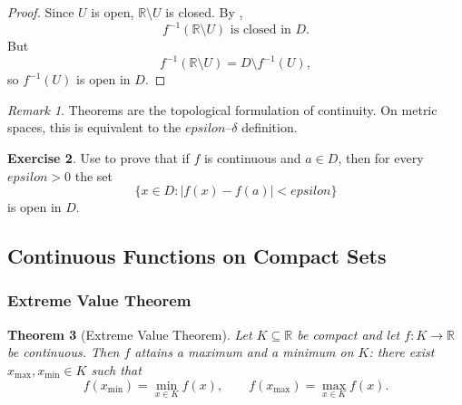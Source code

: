 \documentclass[12pt]{article}
\numberwithin{equation}{section}
\def\abs#1{|#1|}
\def\eps{epsilon}
\newcommand{\RR}{\mathbb{R}}
\DeclarePairedDelimiter{\abs}{\lvert}{\rvert}
\newcommand{\eps}{\varepsilon}               %
\theoremstyle{plain}
\newtheorem{theorem}{Theorem}[section]
\theoremstyle{definition}
\newtheorem{exercise}[theorem]{Exercise}
\theoremstyle{remark}
\newtheorem{remark}[theorem]{Remark}
\begin{document}
\begin{proof}
Since $U$ is open, $\RR\setminus U$ is closed. By ,
\[
f^{-1}(\RR\setminus U) \text{ is closed in } D.
\]
But
\[
f^{-1}(\RR\setminus U)=D\setminus f^{-1}(U),
\]
so $f^{-1}(U)$ is open in $D$.
\end{proof}

\begin{remark}
Theorems  are the topological formulation of continuity.
On metric spaces, this is equivalent to the $\eps$--$\delta$ definition.
\end{remark}

\begin{exercise}
Use  to prove that if $f$ is continuous and $a\in D$, then for every $\eps>0$ the set
\[
\{x\in D:\abs{f(x)-f(a)}<\eps\}
\]
is open in $D$.
\end{exercise}

\newpage

\subsection{Continuous Functions on Compact Sets}

\subsubsection{Extreme Value Theorem}

\begin{theorem}[Extreme Value Theorem]\label{thm:evt}
Let $K\subseteq\RR$ be compact and let $f:K\to\RR$ be continuous.
Then $f$ attains a maximum and a minimum on $K$:
there exist $x_{\max},x_{\min}\in K$ such that
\[
f(x_{\min})=\min_{x\in K} f(x),
\qquad
f(x_{\max})=\max_{x\in K} f(x).
\]
\end{theorem}
\end{document}
